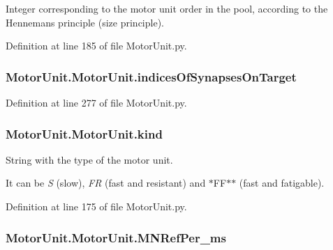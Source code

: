 Integer corresponding to the motor unit order in the pool, according to the Henneman\textquotesingle{}s principle (size principle). 



Definition at line 185 of file Motor\+Unit.\+py.

\subsubsection[{\texorpdfstring{indices\+Of\+Synapses\+On\+Target}{indicesOfSynapsesOnTarget}}]{\setlength{\rightskip}{0pt plus 5cm}Motor\+Unit.\+Motor\+Unit.\+indices\+Of\+Synapses\+On\+Target}\hypertarget{class_motor_unit_1_1_motor_unit_a9b53efb19f9b1a050ef1c21af4316755}{}\label{class_motor_unit_1_1_motor_unit_a9b53efb19f9b1a050ef1c21af4316755}


Definition at line 277 of file Motor\+Unit.\+py.

\subsubsection[{\texorpdfstring{kind}{kind}}]{\setlength{\rightskip}{0pt plus 5cm}Motor\+Unit.\+Motor\+Unit.\+kind}\hypertarget{class_motor_unit_1_1_motor_unit_a08ed5171ba46e0b1ea5bc7d08296c612}{}\label{class_motor_unit_1_1_motor_unit_a08ed5171ba46e0b1ea5bc7d08296c612}


String with the type of the motor unit. 

It can be {\itshape S} (slow), {\itshape FR} (fast and resistant) and $\ast$\+F\+F$\ast$$\ast$ (fast and fatigable). 

Definition at line 175 of file Motor\+Unit.\+py.

\subsubsection[{\texorpdfstring{M\+N\+Ref\+Per\+\_\+ms}{MNRefPer_ms}}]{\setlength{\rightskip}{0pt plus 5cm}Motor\+Unit.\+Motor\+Unit.\+M\+N\+Ref\+Per\+\_\+ms}\hypertarget{class_motor_unit_1_1_motor_unit_abbdaa195ac00926d96d509ae01dcda05}{}\label{class_motor_unit_1_1_motor_unit_abbdaa195ac00926d96d509ae01dcda05}


